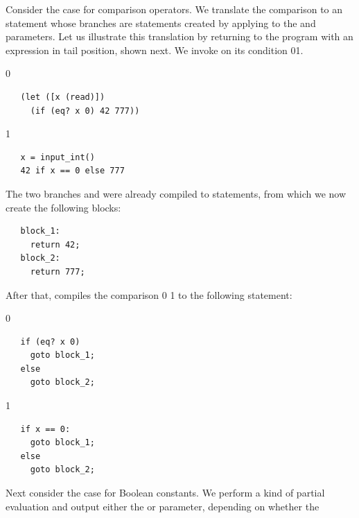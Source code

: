 \documentclass[7x10]{TimesAPriori_MIT}%
\def\racketEd{0}
\def\pythonEd{1}
\providecommand{\BookEdition}{1}
\let\edition\BookEdition
\newcommand{\racket}[1]{{\if\edition\racketEd{#1}\fi}}
\newcommand{\pythonColor}[0]{}
\newcommand{\python}[1]{{\if\edition\pythonEd\pythonColor #1\fi}}
\numberwithin{theorem}{chapter}
\numberwithin{definition}{chapter}
\numberwithin{equation}{chapter}
\begin{document}
Consider the case for comparison operators. We translate the
comparison to an  statement whose branches are 
statements created by applying  to the 
and  parameters. Let us illustrate this translation by
returning to the program with an  expression in tail
position, shown next. We invoke  on its
condition \racket{}\python{}.
%
{\if\edition\racketEd
\begin{lstlisting}
   (let ([x (read)])
     (if (eq? x 0) 42 777))
\end{lstlisting}
\fi}
%
{\if\edition\pythonEd\pythonColor
\begin{lstlisting}
   x = input_int()
   42 if x == 0 else 777
\end{lstlisting}
\fi}
%
\noindent The two branches  and  were already
compiled to  statements, from which we now create the
following blocks:
%
\begin{center}
\begin{minipage}{\textwidth}
\begin{lstlisting}
   block_1:
     return 42;
   block_2:
     return 777;
\end{lstlisting}
  \end{minipage}
\end{center}
%
After that,  compiles the comparison
\racket{}
\python{}
to the following  statement:
%
{\if\edition\racketEd
\begin{center}
\begin{minipage}{\textwidth}
\begin{lstlisting}
   if (eq? x 0)
     goto block_1;
   else
     goto block_2;
\end{lstlisting}
\end{minipage}
\end{center}
\fi}
{\if\edition\pythonEd\pythonColor
\begin{center}
\begin{minipage}{\textwidth}
\begin{lstlisting}
   if x == 0:
     goto block_1;
   else
     goto block_2;
\end{lstlisting}
\end{minipage}
\end{center}
\fi}
Next consider the case for Boolean constants. We perform a kind of
partial evaluation and output
either the  or  parameter, depending on whether the
\end{document}
